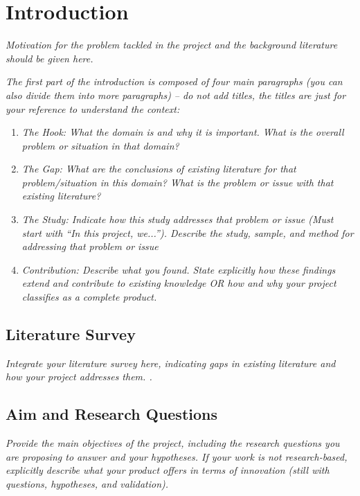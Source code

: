 \section{Introduction}

\textit{Motivation for the problem tackled in the project and the background literature should be given here.}

\textit{ The first part of the introduction is composed of four main paragraphs (you can also divide them into more paragraphs) -- do not add titles, the titles are just for your reference to understand the context:}

\begin{enumerate}
    \item \textit{The Hook: What the domain is and why it is important. What is the overall problem or situation in that domain?}
    
    \item \textit{The Gap: What are the conclusions of existing literature for that problem/situation in this domain? What is the problem or issue with that existing literature?}
    
    \item \textit{The Study: Indicate how this study addresses that problem or issue (Must start with ``In this project, we...''). Describe the study, sample, and method for addressing that problem or issue}
    
    \item \textit{Contribution: Describe what you found. State explicitly how these findings extend and contribute to existing knowledge OR how and why your project classifies as a complete product.}
\end{enumerate}



\subsection{Literature Survey}
\textit{Integrate your literature survey here, indicating gaps in existing literature and how your project addresses them. \cite{dummy_ref}.} 

\subsection{Aim and Research Questions}
\textit{Provide the main objectives of the project, including the research questions you are proposing to answer and your hypotheses. If your work is not research-based, explicitly describe what your product offers in terms of innovation (still with questions, hypotheses, and validation). }
